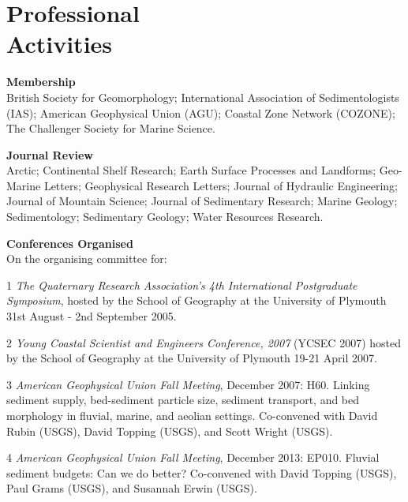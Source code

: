 \documentclass[margin,line]{resume}
\begin{document}
\begin{resume}
\begin{footnotesize}
\begin{list1}
	\end{list1}
        \end{footnotesize}

    \section{\mysidestyle Professional \\Activities}
    \begin{footnotesize} 
    {\bf Membership}\\
    British Society for Geomorphology; International Association of Sedimentologists (IAS); American Geophysical Union (AGU); Coastal Zone Network (COZONE); The Challenger Society for Marine Science.

    {\bf Journal Review} \\
 	Arctic; Continental Shelf Research; Earth Surface Processes and Landforms; Geo-Marine Letters; Geophysical Research Letters; Journal of Hydraulic Engineering; Journal of Mountain Science; Journal of Sedimentary Research; Marine Geology; Sedimentology; Sedimentary Geology; Water Resources Research.
     \end{footnotesize}

    \begin{footnotesize} 
    {\bf Conferences Organised}\\
	On the organising committee for:
	\begin{list1}
	\item[1] {\sl The Quaternary Research Association's 4th International Postgraduate Symposium}, hosted by the School of Geography at the University of Plymouth 31st August - 2nd September 2005.\\
	\item[2] {\sl Young Coastal Scientist and Engineers Conference, 2007} (YCSEC 2007)  hosted by the School of Geography at the University of Plymouth 19-21 April 2007. \\
	\item[3] {\sl American Geophysical Union Fall Meeting}, December 2007: H60. Linking sediment supply, bed-sediment particle size, sediment transport, and bed morphology in fluvial, marine, and aeolian settings. Co-convened with David Rubin (USGS), David Topping (USGS), and Scott Wright (USGS).\\
	\item[4] {\sl American Geophysical Union Fall Meeting}, December 2013: EP010. Fluvial sediment budgets: Can we do better? Co-convened with David Topping (USGS), Paul Grams (USGS), and Susannah Erwin (USGS).
	\end{list1}
        \end{footnotesize}


\end{resume}
\end{document}
